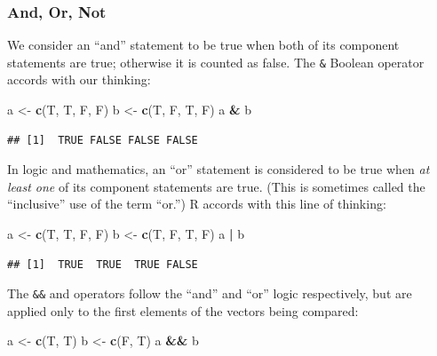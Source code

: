 \documentclass[]{book}
\makeatletter
\newenvironment{Shaded}{\begin{snugshade}}{\end{snugshade}}
\newcommand{\KeywordTok}[1]{\textcolor[rgb]{0.13,0.29,0.53}{\textbf{#1}}}
\newcommand{\StringTok}[1]{\textcolor[rgb]{0.31,0.60,0.02}{#1}}
\newcommand{\OperatorTok}[1]{\textcolor[rgb]{0.81,0.36,0.00}{\textbf{#1}}}
\newcommand{\NormalTok}[1]{#1}
\newenvironment{kframe}{%
\medskip{}
\setlength{\fboxsep}{.8em}
 \def\at@end@of@kframe{}%
 \ifinner\ifhmode%
  \def\at@end@of@kframe{\end{minipage}}%
  \begin{minipage}{\columnwidth}%
 \fi\fi%
 \def\FrameCommand##1{\hskip\@totalleftmargin \hskip-\fboxsep
 \colorbox{shadecolor}{##1}\hskip-\fboxsep
     \hskip-\linewidth \hskip-\@totalleftmargin \hskip\columnwidth}%
 \MakeFramed {\advance\hsize-\width
   \@totalleftmargin\z@ \linewidth\hsize
   \@setminipage}}%
 {\par\unskip\endMakeFramed%
 \at@end@of@kframe}
\renewenvironment{Shaded}{\begin{kframe}}{\end{kframe}}
\theoremstyle{definition}
\theoremstyle{definition}
\theoremstyle{definition}
\theoremstyle{remark}
\makeatother
\begin{document}
\subsubsection{And, Or, Not}\label{and-or-not}

We consider an ``and'' statement to be true when both of its component
statements are true; otherwise it is counted as false. The \texttt{\&}
Boolean operator accords with our thinking:

\begin{Shaded}
\begin{Highlighting}[]
\NormalTok{a <-}\StringTok{ }\KeywordTok{c}\NormalTok{(T, T, F, F)}
\NormalTok{b <-}\StringTok{ }\KeywordTok{c}\NormalTok{(T, F, T, F)}
\NormalTok{a }\OperatorTok{&}\StringTok{ }\NormalTok{b}
\end{Highlighting}
\end{Shaded}

\begin{verbatim}
## [1]  TRUE FALSE FALSE FALSE
\end{verbatim}

In logic and mathematics, an ``or'' statement is considered to be true
when \emph{at least one} of its component statements are true. (This is
sometimes called the ``inclusive'' use of the term ``or.'') R accords
with this line of thinking:

\begin{Shaded}
\begin{Highlighting}[]
\NormalTok{a <-}\StringTok{ }\KeywordTok{c}\NormalTok{(T, T, F, F)}
\NormalTok{b <-}\StringTok{ }\KeywordTok{c}\NormalTok{(T, F, T, F)}
\NormalTok{a }\OperatorTok{|}\StringTok{ }\NormalTok{b}
\end{Highlighting}
\end{Shaded}

\begin{verbatim}
## [1]  TRUE  TRUE  TRUE FALSE
\end{verbatim}

The \texttt{\&\&} and \texttt{\textbar{}\textbar{}} operators follow the
``and'' and ``or'' logic respectively, but are applied only to the first
elements of the vectors being compared:

\begin{Shaded}
\begin{Highlighting}[]
\NormalTok{a <-}\StringTok{ }\KeywordTok{c}\NormalTok{(T, T)}
\NormalTok{b <-}\StringTok{ }\KeywordTok{c}\NormalTok{(F, T)}
\NormalTok{a }\OperatorTok{&&}\StringTok{ }\NormalTok{b}
\end{Highlighting}
\end{Shaded}
\end{document}
